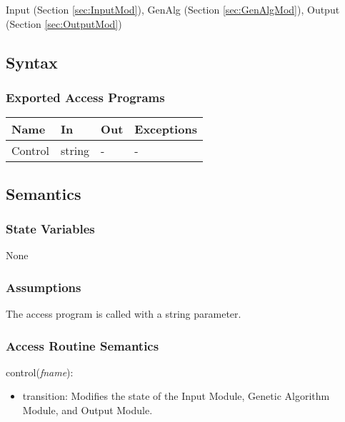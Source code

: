 \documentclass[12pt, titlepage]{article}
\begin{document}
Input (Section \ref{sec:InputMod}), GenAlg (Section \ref{sec:GenAlgMod}), 
Output (Section \ref{sec:OutputMod})

\subsection{Syntax}

\subsubsection{Exported Access Programs}

\begin{center}
\renewcommand*{\arraystretch}{1.5}
\begin{tabular} {|p{}| p{}
    |p{} |p{}|}
  \hline \textbf{Name} & \textbf{In} & \textbf{Out} &
  \textbf{Exceptions} \\ \hline

  Control & string & - & - \\ \hline
\end{tabular}
\end{center}

\subsection{Semantics}

\subsubsection{State Variables}

None

\subsubsection{Assumptions}

The access program is called with a string parameter.

\subsubsection{Access Routine Semantics}

control(\textit{fname}):
\begin{itemize}
	\item transition: Modifies the state of the Input Module, Genetic Algorithm 
	Module, and Output Module.
\end{itemize}
\end{document}
